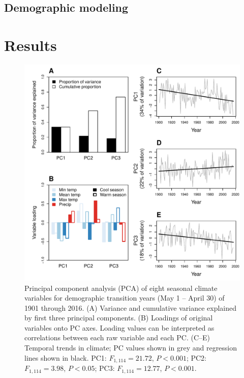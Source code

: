 \documentclass[12pt]{article}\usepackage[]{graphicx}\usepackage[]{color}
\makeatletter
\def\maxwidth{ %
  \ifdim\Gin@nat@width>\linewidth
    \linewidth
  \else
    \Gin@nat@width
  \fi
}
\newenvironment{knitrout}{}{} %
\makeatother
\begin{document}

\subsection*{Demographic modeling}

\section*{Results}

\begin{figure}[h!]
  \label{fig:PCA}
\begin{knitrout}
\color{fgcolor}

{\centering \includegraphics[width=\maxwidth]{figure/PCA_results-1} 

}



\end{knitrout}
  \caption{Principal component analysis (PCA) of eight seasonal climate variables for demographic transition years (May 1 -- April 30) of 1901 through 2016. 
  (A) Variance and cumulative variance explained by first three principal components. 
  (B) Loadings of original variables onto PC axes. Loading values can be interpreted as correlations between each raw variable and each PC. 
  (C--E) Temporal trends in climate; PC values shown in grey and regression lines shown in black. 
  PC1: $F_{1,114} = 21.72$, $P < 0.001$; 
  PC2: $F_{1,114} = 3.98$, $P < 0.05$; 
  PC3: $F_{1,114} = 12.77$, $P < 0.001$.}
\end{figure}
\end{document}

